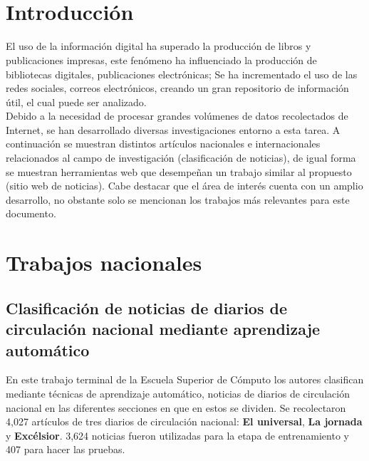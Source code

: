 
\ \\\\
\section{Introducción}


El uso de la información digital ha superado la producción de libros y publicaciones impresas, este fenómeno ha influenciado la producción de bibliotecas digitales, publicaciones electrónicas; Se ha incrementado el uso de las redes sociales, correos electrónicos, creando un gran repositorio de información útil, el cual puede ser analizado\citep{CD1}.\\

Debido a la necesidad de procesar grandes volúmenes de datos recolectados de Internet, se han desarrollado diversas investigaciones entorno a esta tarea. A continuación se muestran distintos artículos nacionales e internacionales relacionados al campo de investigación (clasificación de noticias), de igual forma se muestran herramientas web que desempeñan un trabajo similar al propuesto (sitio web de noticias). Cabe destacar que el área de interés cuenta con un amplio desarrollo, no obstante solo se mencionan los trabajos más relevantes para este documento.


\section{Trabajos nacionales}


\begin{large}
	 \subsection[Clasificación de noticias de diarios]{Clasificación de noticias de diarios de circulación nacional mediante aprendizaje automático }
\end{large}


En este trabajo terminal de la Escuela Superior de Cómputo \citep{CD2} los autores clasifican mediante técnicas de aprendizaje automático, noticias de diarios de circulación nacional en las diferentes secciones en que en estos se dividen. Se recolectaron 4,027 artículos de tres diarios de circulación nacional: \textbf{El universal}, \textbf{La jornada} y \textbf{Excélsior}. 3,624 noticias fueron utilizadas para la etapa de entrenamiento y 407 para hacer las pruebas.\\

